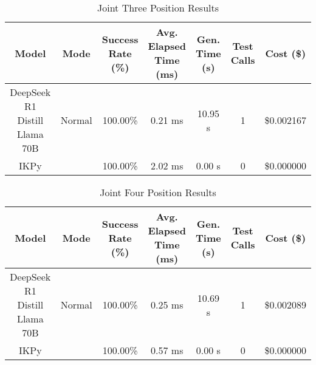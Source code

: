 \begin{table}[H]
\tiny
\renewcommand{\arraystretch}{1.2}
\caption{Joint Three Position Results}
\begin{center}
\begin{tabular}{|c|c|c|c|c|c|c|}
    \hline
    \textbf{Model} & 
    \textbf{Mode} & 
    \makecell{\textbf{Success}\\\textbf{Rate (\%)}} &
    \makecell{\textbf{Avg. Elapsed}\\\textbf{Time (ms)}} &
    \makecell{\textbf{Gen.}\\\textbf{Time (s)}} &
    \makecell{\textbf{Test}\\\textbf{Calls}} &
    \textbf{Cost (\$)} \\
    \hline
    DeepSeek R1 Distill Llama 70B & Normal & 100.00\% & 0.21 ms & 10.95 s & 1 & \$0.002167 \\
    \hline
    IKPy &  & 100.00\% & 2.02 ms & 0.00 s & 0 & \$0.000000 \\
    \hline
\end{tabular}
\label{Results-Position-3-3}
\end{center}
\end{table}

\begin{table}[H]
\tiny
\renewcommand{\arraystretch}{1.2}
\caption{Joint Four Position Results}
\begin{center}
\begin{tabular}{|c|c|c|c|c|c|c|}
    \hline
    \textbf{Model} & 
    \textbf{Mode} & 
    \makecell{\textbf{Success}\\\textbf{Rate (\%)}} &
    \makecell{\textbf{Avg. Elapsed}\\\textbf{Time (ms)}} &
    \makecell{\textbf{Gen.}\\\textbf{Time (s)}} &
    \makecell{\textbf{Test}\\\textbf{Calls}} &
    \textbf{Cost (\$)} \\
    \hline
    DeepSeek R1 Distill Llama 70B & Normal & 100.00\% & 0.25 ms & 10.69 s & 1 & \$0.002089 \\
    \hline
    IKPy &  & 100.00\% & 0.57 ms & 0.00 s & 0 & \$0.000000 \\
    \hline
\end{tabular}
\label{Results-Position-4-4}
\end{center}
\end{table}

